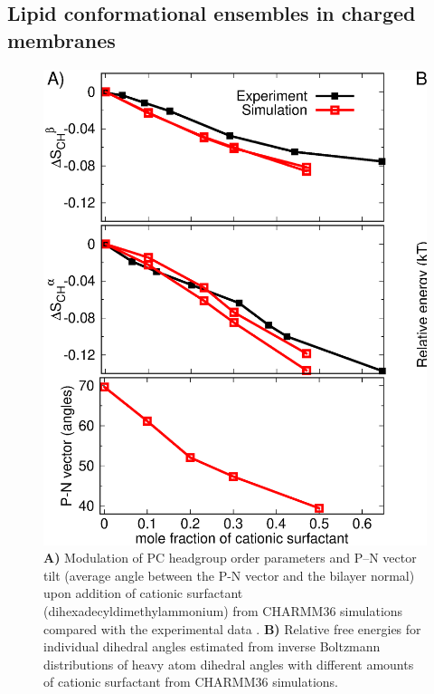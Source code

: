 \documentclass[journal=jpcbfk,manuscript=article]{achemso}
\begin{document}
\subsection{Lipid conformational ensembles in charged membranes}



\begin{figure}[bt]
  \centering
  \includegraphics[width=\textwidth]{./Figs/HGorderparametersPCvsSURFchangeDIHEDRALSlog.eps}
  \caption{\label{changesWITHsurf}
    \textbf{A)} Modulation of PC headgroup order parameters and P--N vector tilt (average angle between the P-N vector and the bilayer normal) upon addition of cationic surfactant (dihexadecyldimethylammonium)
    from CHARMM36 simulations compared with the experimental data \cite{scherer89}.
    \textbf{B)} Relative free energies for individual dihedral angles estimated from inverse Boltzmann distributions of heavy atom dihedral angles
    with different amounts of cationic surfactant from CHARMM36 simulations.
  }
\end{figure}
\end{document}
